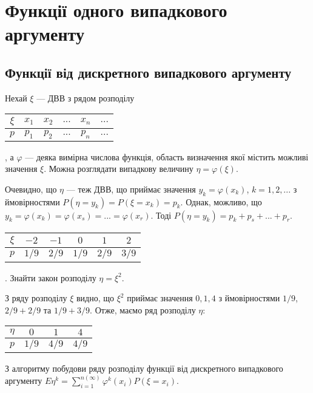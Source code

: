 
\section{Функції одного випадкового аргументу}
\subsection{Функції від дискретного випадкового аргументу}
Нехай $\xi$ --- ДВВ з рядом розподілу 
\begin{tabular}{|c|c|c|c|c|c|}
    \hline
    $\xi$ & $x_1$ & $x_2$ & $...$ & $x_n$ & $...$ \\
    \hline
    $p$ & $p_1$ & $p_2$ & $...$ & $p_n$ & $...$ \\
    \hline
\end{tabular}, а $\varphi$ --- деяка вимірна числова функція, 
область визначення якої містить можливі значення $\xi$.
Можна розглядати випадкову величину $\eta = \varphi(\xi)$.

Очевидно, що $\eta$ --- теж ДВВ, що приймає значення $y_k = \varphi(x_k)$, 
$k = 1, 2, ...$ з ймовірностями $P(\eta = y_k) = P(\xi = x_k) = p_k$.
Однак, можливо, що $y_k = \varphi(x_k) = \varphi(x_s) = ... = \varphi(x_r)$.
Тоді $P(\eta = y_k) = p_k + p_s + ... + p_r$.

\begin{example}
    \begin{tabular}{|c|c|c|c|c|c|}
        \hline
        $\xi$ & $-2$ & $-1$ & $0$ & $1$ & $2$ \\
        \hline
        $p$ & $1/9$ & $2/9$ & $1/9$ & $2/9$ & $3/9$ \\
        \hline
    \end{tabular}. Знайти закон розподілу $\eta = \xi^2$.
    
    З ряду розподілу $\xi$ видно, що $\xi^2$ приймає значення $0, 1, 4$ з
    ймовірностями $1/9$, $2/9 + 2/9$ та $1/9 + 3/9$.
    Отже, маємо ряд розподілу $\eta$: \begin{tabular}{|c|c|c|c|}
        \hline
        $\eta$ & $0$ & $1$ & $4$ \\
        \hline
        $p$ & $1/9$ & $4/9$ & $4/9$ \\
        \hline
    \end{tabular}
\end{example}

З алгоритму побудови ряду розподілу функції від дискретного
випадкового аргументу $E\eta^k = \sum\limits_{i=1}^{n(\infty)} \varphi^k(x_i) P(\xi = x_i)$.

